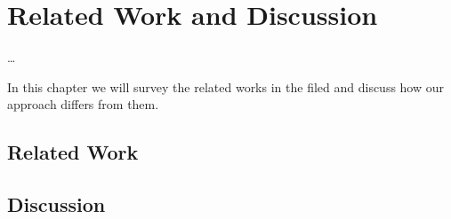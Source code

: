 \chapter{Related Work and Discussion} \label{chap:related} 

\ifpdf
    \graphicspath{{7/figures/PNG/}{7/figures/PDF/}{7/figures/}}
\else
    \graphicspath{{7/figures/EPS/}{7/figures/}}
\fi

\dots

In this chapter we will survey the related works in the filed and discuss how our approach differs from them.

\section{Related Work}

\section{Discussion}
